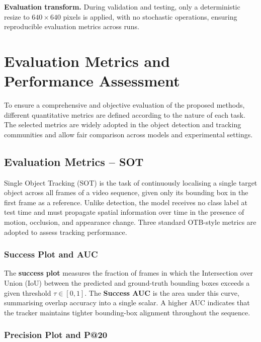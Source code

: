 \documentclass[
]{article}
\begin{document}
\textbf{Evaluation transform.} During validation and testing, only a deterministic resize to $640 \times 640$ pixels is applied, with no stochastic operations, ensuring reproducible evaluation metrics across runs.


\setlength{\LTpre}{\bigskipamount}
\setlength{\LTpost}{\bigskipamount}

\hypertarget{Evaluation Metrics and Performance Assessment}{%
\section{Evaluation Metrics and Performance Assessment}\label{Evaluation Metrics and Performance Assessment}}

To ensure a comprehensive and objective evaluation of the proposed methods, different quantitative metrics are defined according to the nature of each task. 
The selected metrics are widely adopted in the object detection and tracking communities and allow fair comparison across models and experimental settings. 

\hypertarget{Evaluation Metrics - SOT}{%
\subsection{Evaluation Metrics -- SOT}\label{Evaluation Metrics - SOT}}

Single Object Tracking (SOT) is the task of continuously localising a single target object across all frames of a video sequence, given only its bounding box in the first frame as a reference. Unlike detection, 
the model receives no class label at test time and must propagate spatial information over time in the presence of motion, occlusion, and appearance change. Three standard OTB-style metrics are adopted to assess tracking performance.

\subsubsection*{Success Plot and AUC}

The \textbf{success plot} measures the fraction of frames in which the Intersection over Union (IoU) between the predicted and ground-truth bounding boxes exceeds a given threshold $\tau \in [0, 1]$. The \textbf{Success AUC} is the area under this curve, summarising overlap accuracy into a single scalar. A higher AUC indicates that the tracker maintains tighter bounding-box alignment throughout the sequence.

\subsubsection*{Precision Plot and P@20}
\end{document}
